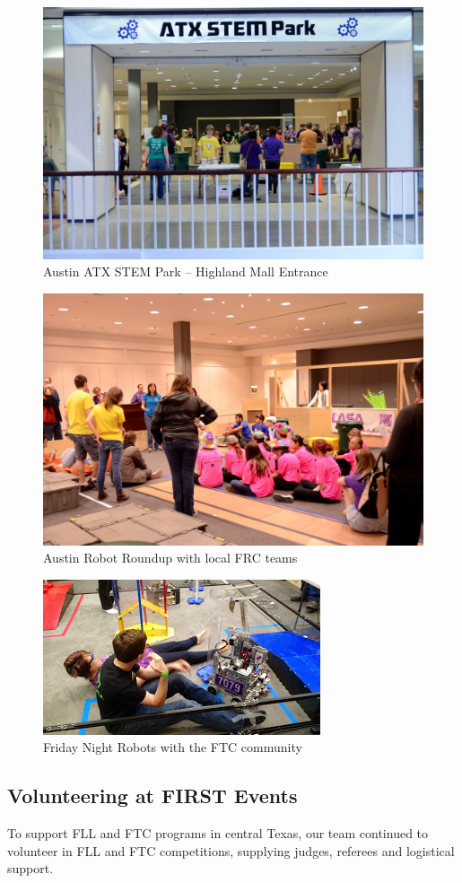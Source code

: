 \begin{figure}[H]
	\centering
	\includegraphics[width=0.8\linewidth]{stempark}
	\caption[]{Austin ATX STEM Park – Highland Mall Entrance}
	\label{fig:stempark}
\end{figure}
\begin{figure}[H]
	\centering
	\includegraphics[width=0.5\linewidth]{arr}
	\caption[]{Austin Robot Roundup with local FRC teams}
	\label{fig:arr}
\end{figure}
\begin{figure}[H]
	\centering
	\includegraphics[width=0.5\linewidth]{fridaynight}
	\caption[]{Friday Night Robots with the FTC community}
	\label{fig:fridaynight}
\end{figure}

\subsection{Volunteering at FIRST Events}
To support FLL and FTC programs in central Texas, our team continued to volunteer in FLL and FTC competitions, supplying judges, referees and logistical support.\\

